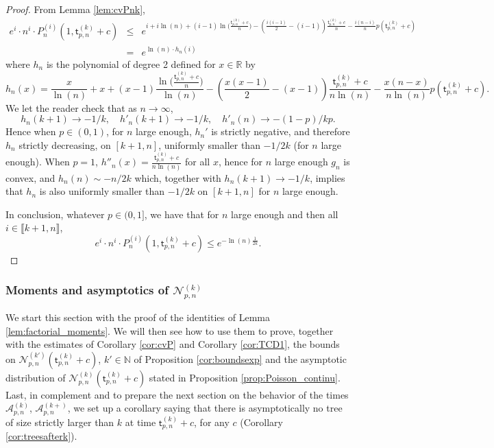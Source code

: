 \documentclass[a4, 11pt]{article}
\numberwithin{equation}{section}
\theoremstyle{plain}
\theoremstyle{definition}
\theoremstyle{remark}
\begin{document}
\begin{proof}
From Lemma \ref{lem:cvPnk},
\begin{eqnarray*}
 e^{i} \cdot n^i \cdot P_n^{(i)}(1,\mathsf t^{(k)}_{p,n}+c) &\leq& e^{i+i\ln(n)+(i-1)\ln\Big(\frac{\mathsf t^{(k)}_{p,n}+c}{n}\Big)-\left(\frac{i(i-1)}{2}-(i-1)\right)\frac{\mathsf t^{(k)}_{p,n}+c}{n}-\frac{i(n-i)}{n}p(\mathsf t^{(k)}_{p,n}+c)} \\
 &=& e^{\ln(n)\cdot h_n(i)}
\end{eqnarray*}
where $h_n$ is the polynomial of degree 2 defined for $x \in \mathbb R$ by
$$
h_n(x)=\frac{x}{\ln(n)}+x+(x-1)\frac{\ln\Big(\frac{\mathsf t^{(k)}_{p,n}+c}{n}\Big)}{\ln(n)}-\left(\frac{x(x-1)}{2}-(x-1)\right)\frac{\mathsf t^{(k)}_{p,n}+c}{n \ln(n)}-\frac{x(n-x)}{n \ln(n)}p(\mathsf t^{(k)}_{p,n}+c).
$$
We let the reader check that as $n \rightarrow \infty$, 
$$h_n(k+1)\rightarrow -1/k, \quad  h'_n(k+1)\rightarrow -1/k, \quad h'_n(n) \rightarrow -(1-p)/kp.$$ Hence when $p \in (0,1)$, for $n$ large enough, $h_n'$ is strictly negative, and therefore $h_n$ strictly decreasing, on $[k+1,n]$, uniformly smaller than $-1/2k$ (for $n$ large enough). When $p=1$, $h''_n(x)=\frac{\mathsf t^{(k)}_{p,n}+c}{n\ln(n)}$ for all $x$, hence for $n$ large enough $g_n$ is convex, and $h_n(n) \sim-n/2k$ which, together with $h_n(k+1)\rightarrow -1/k$, implies that $h_n$ is also uniformly smaller than $-1/2k$ on $[k+1,n]$ for $n$ large enough. 

In conclusion, whatever $p \in (0,1]$, we have that for $n$ large enough and then all $i \in \llbracket k+1 ,n\rrbracket$,
$$
e^{i} \cdot n^i \cdot P_n^{(i)}(1,\mathsf t^{(k)}_{p,n}+c) \leq e^{-\ln(n) \frac{1}{2k}}.
$$
\end{proof}



\subsubsection{Moments and asymptotics of $\mathcal N_{p,n}^{(k)}$}
\label{sub:moments}

We start this section with the proof of the identities of Lemma \ref{lem:factorial_moments}. We will then see how to use them to prove, together with the estimates of Corollary \ref{cor:cvP} and Corollary \ref{cor:TCD1}, the bounds on $\mathcal N_{p,n}^{(k')}(\mathsf t^{(k)}_{p,n}+c)$, $k' \in \mathbb N$ of Proposition \ref{cor:boundsexp} and the asymptotic distribution of $\mathcal N_{p,n}^{(k)}(\mathsf t^{(k)}_{p,n}+c)$ stated in Proposition \ref{prop:Poisson_continu}. Last, in complement and to prepare the next section on the behavior of the times $\mathcal A_{p,n}^{(k)}$, $\mathcal A_{p,n}^{(k+)}$, we set up a corollary saying that there is asymptotically no tree of size strictly larger than $k$ at time $\mathsf t^{(k)}_{p,n}+c$, for any $c$ (Corollary \ref{cor:treesafterk}). 
\end{document}
